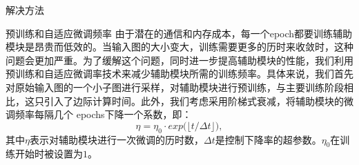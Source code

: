 \begin{section}{解决方法}
\begin{subsection}{预训练和自适应微调频率}
由于潜在的通信和内存成本，每一个epoch都要训练辅助模块是昂贵而低效的。当输入图的大小变大，训练需要更多的历时来收敛时，这种问题会更加严重。为了缓解这个问题，同时进一步提高辅助模块的性能，我们利用预训练和自适应微调率技术来减少辅助模块所需的训练频率。具体来说，我们首先对原始输入图的一个小子图进行采样，对辅助模块进行预训练，与主要训练阶段相比，这只引入了边际计算时间。此外，我们考虑采用阶梯式衰减，将辅助模块的微调频率每隔几个 epochs下降一个系数，即：
\begin{equation}
    \eta =  \eta_0 \cdot exp\big( \lfloor t / \Delta t \rfloor\big),
\end{equation}
其中$\eta$表示对辅助模块进行一次微调的历时数，$\Delta t$是控制下降率的超参数。$\eta_0$在训练开始时被设置为$1$。
\end{subsection}

   
\end{section}


